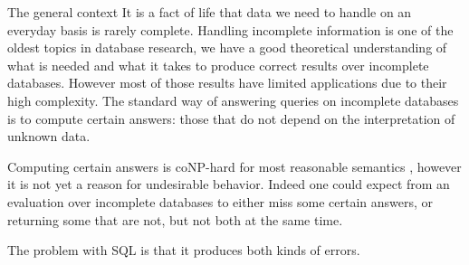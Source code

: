 
%
%
%
%
%
%
% 
%
%
%
%
%
%


\begin{point}{The general context}
  It is a fact of life that data we need to handle on an everyday basis is rarely complete.  Handling incomplete information is one of the oldest topics in database research, we have a good theoretical understanding of what is needed and what it takes to produce correct results over incomplete databases. However most of those results have limited applications due to their high complexity. The standard way of answering queries on incomplete databases is to compute certain answers:  those that do not depend on the interpretation of unknown data. 
  
  Computing certain answers is coNP-hard for most reasonable semantics \cite{abiteboul1991representation}, however it is not yet a reason for undesirable behavior. Indeed one could expect from an evaluation over incomplete databases to either miss some certain answers, or returning some that are not, but not both at the same time. 
  
  The problem with SQL is that it produces both kinds of errors. \cite{guagliardo2016making}

\end{point}


